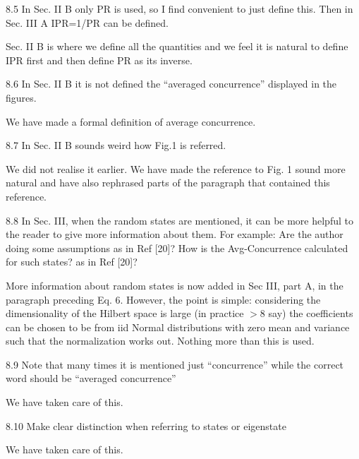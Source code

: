 \documentclass[english]{letter}
\newcommand{\arun}[1]{\textrm{\textcolor{red}{Arun: #1}}}
\begin{document}
\begin{shaded}
8.5 In Sec. II B only PR is used, so I find convenient to just define
this. Then in Sec. III A IPR=1/PR can be defined.
\end{shaded}
\noindent Sec. II B is where we define all the quantities and we feel it is natural to define IPR first and then
define PR as its inverse.

\begin{shaded}
8.6 In Sec. II B it is not defined the “averaged concurrence”
displayed in the figures.
\end{shaded}
\noindent We have made a formal definition of average concurrence. 

\begin{shaded}
8.7 In Sec. II B sounds weird how Fig.1 is referred.
\end{shaded}
\noindent We did not realise it earlier. We have made the reference to Fig. 1 sound more natural and have also
rephrased parts of the paragraph that contained this reference.

\begin{shaded}
8.8 In Sec. III, when the random states are mentioned, it can be more
helpful to the reader to give more information about them. For
example: Are the author doing some assumptions as in Ref [20]? How is
the Avg-Concurrence calculated for such states? as in Ref [20]?
\end{shaded}
\noindent More information about random states is now added in Sec III, part A, in the
paragraph preceding Eq. 6. However, the point is simple: considering the dimensionality
of the Hilbert space is large (in practice $>8$ say) the coefficients can be chosen to be from 
iid Normal distributions with zero mean and variance such that the normalization works out.
Nothing more than this is used. 

\begin{shaded}
8.9 Note that many times it is mentioned just “concurrence” while the
correct word should be “averaged concurrence”
\end{shaded}
\noindent We have taken care of this.

\begin{shaded}
8.10 Make clear distinction when referring to states or eigenstate
\end{shaded}
\noindent We have taken care of this. 
\end{document}

